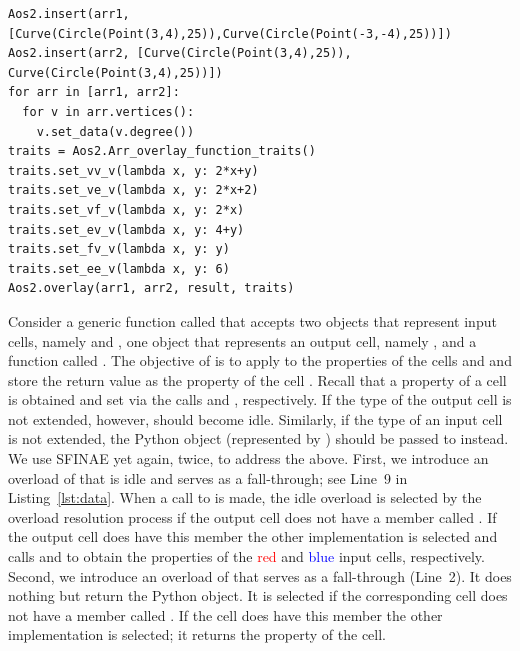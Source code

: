 \begin{lstfloat}
\begin{lstlisting}[style=pythonFramedStyle,basicstyle=\scriptsize,
                   label={lst::overlayCircleSegment},
                   caption={Constructing two arrangements with their vertices extended and computing their map overlay using the overlay function traits.}]
Aos2.insert(arr1,[Curve(Circle(Point(3,4),25)),Curve(Circle(Point(-3,-4),25))])
Aos2.insert(arr2, [Curve(Circle(Point(3,4),25)), Curve(Circle(Point(3,4),25))])
for arr in [arr1, arr2]:
  for v in arr.vertices():
    v.set_data(v.degree())
traits = Aos2.Arr_overlay_function_traits()
traits.set_vv_v(lambda x, y: 2*x+y)
traits.set_ve_v(lambda x, y: 2*x+2)
traits.set_vf_v(lambda x, y: 2*x)
traits.set_ev_v(lambda x, y: 4+y)
traits.set_fv_v(lambda x, y: y)
traits.set_ee_v(lambda x, y: 6)
Aos2.overlay(arr1, arr2, result, traits)
\end{lstlisting}
\end{lstfloat}

Consider a generic function called  that accepts two objects that represent input cells, namely  and , one object that represents an output cell, namely , and a function called . The objective of  is to apply  to the properties of the cells  and  and store the return value as the property of the cell . Recall that a property of a cell  is obtained and set via the calls  and , respectively. If the type of the output cell is not extended, however,  should become idle. Similarly, if the type of an input cell is not extended, the  Python object (represented by ) should be passed to  instead. We use SFINAE yet again, twice, to address the above. First, we introduce an overload of  that is idle and serves as a fall-through; see Line~9 in Listing~\ref{lst:data}. When a call to  is made, the idle overload is selected by the overload resolution process if the output cell does not have a member called . If the output cell does have this member the other implementation is selected and calls  and  to obtain the properties of the \textcolor{red}{red} and \textcolor{blue}{blue} input cells, respectively. Second, we introduce an overload of  that serves as a fall-through (Line~2). It does nothing but return the  Python object. It is selected if the corresponding cell does not have a member called . If the cell does have this member the other implementation is selected; it returns the property of the cell.

